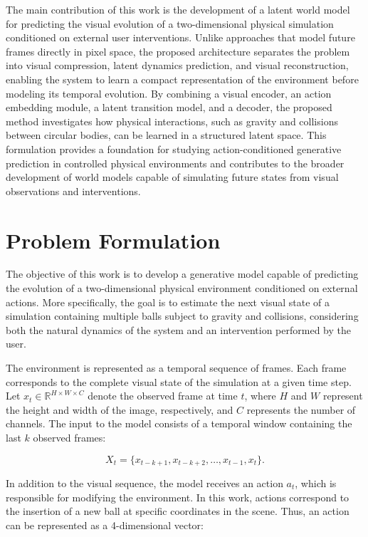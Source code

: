\documentclass[conference]{IEEEtran}
\begin{document}
The main contribution of this work is the development of a latent world model for predicting the visual evolution of a two-dimensional physical simulation conditioned on external user interventions. Unlike approaches that model future frames directly in pixel space, the proposed architecture separates the problem into visual compression, latent dynamics prediction, and visual reconstruction, enabling the system to learn a compact representation of the environment before modeling its temporal evolution. By combining a visual encoder, an action embedding module, a latent transition model, and a decoder, the proposed method investigates how physical interactions, such as gravity and collisions between circular bodies, can be learned in a structured latent space. This formulation provides a foundation for studying action-conditioned generative prediction in controlled physical environments and contributes to the broader development of world models capable of simulating future states from visual observations and interventions.

\section{Problem Formulation}
\label{sec:problem_formulation}

The objective of this work is to develop a generative model capable of predicting the evolution of a two-dimensional physical environment conditioned on external actions. More specifically, the goal is to estimate the next visual state of a simulation containing multiple balls subject to gravity and collisions, considering both the natural dynamics of the system and an intervention performed by the user.

The environment is represented as a temporal sequence of frames. Each frame corresponds to the complete visual state of the simulation at a given time step. Let \(x_t \in \mathbb{R}^{H \times W \times C}\) denote the observed frame at time \(t\), where \(H\) and \(W\) represent the height and width of the image, respectively, and \(C\) represents the number of channels. The input to the model consists of a temporal window containing the last \(k\) observed frames:

\begin{equation}
    X_t = \{x_{t-k+1}, x_{t-k+2}, \ldots, x_{t-1}, x_t\}.
\end{equation}

In addition to the visual sequence, the model receives an action \(a_t\), which is responsible for modifying the environment. In this work, actions correspond to the insertion of a new ball at specific coordinates in the scene. Thus, an action can be represented as a 4-dimensional vector:
\end{document}
